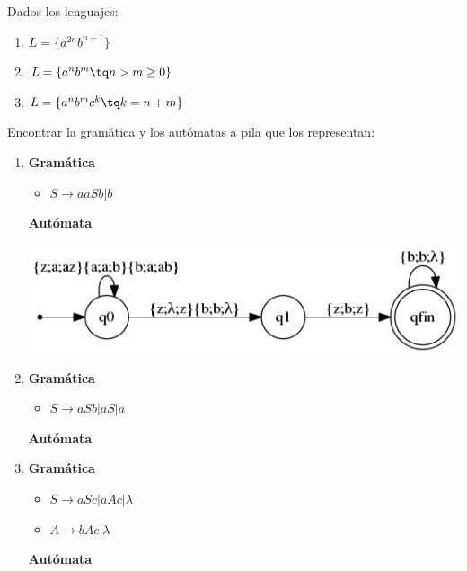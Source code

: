 \begin{problem}
Dados los lenguajes:
\begin{enumerate}
\item $L=\{a^{2n}b^{n+1}\}$
\item $L=\{a^nb^m \tq n > m \geq 0\}$
\item $L=\{a^nb^mc^k \tq k = n+m \}$
\end{enumerate}
Encontrar la gramática y los autómatas a pila que los representan:
\solution
\begin{enumerate}
\item \textbf{Gramática}
\begin{itemize}
\item $S \rightarrow aaSb|b$
\end{itemize}
\textbf{Autómata}
\begin{center}
\includegraphics[scale=0.75]{tex/automata4.png}
\end{center}

\item \textbf{Gramática}
\begin{itemize}
\item $S \rightarrow aSb|aS|a$
\end{itemize}
\textbf{Autómata}

\item \textbf{Gramática}
\begin{itemize}
\item $S \rightarrow aSc|aAc|\lambda$
\item $A \rightarrow bAc|\lambda$
\end{itemize}
\textbf{Autómata}
\end{enumerate}
\end{problem}